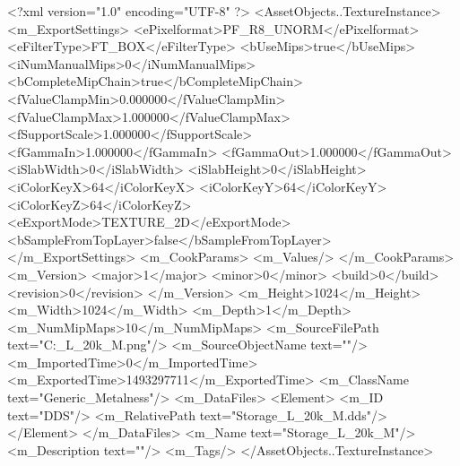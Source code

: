 <?xml version="1.0" encoding="UTF-8" ?>
<AssetObjects..TextureInstance>
	<m_ExportSettings>
		<ePixelformat>PF_R8_UNORM</ePixelformat>
		<eFilterType>FT_BOX</eFilterType>
		<bUseMips>true</bUseMips>
		<iNumManualMips>0</iNumManualMips>
		<bCompleteMipChain>true</bCompleteMipChain>
		<fValueClampMin>0.000000</fValueClampMin>
		<fValueClampMax>1.000000</fValueClampMax>
		<fSupportScale>1.000000</fSupportScale>
		<fGammaIn>1.000000</fGammaIn>
		<fGammaOut>1.000000</fGammaOut>
		<iSlabWidth>0</iSlabWidth>
		<iSlabHeight>0</iSlabHeight>
		<iColorKeyX>64</iColorKeyX>
		<iColorKeyY>64</iColorKeyY>
		<iColorKeyZ>64</iColorKeyZ>
		<eExportMode>TEXTURE_2D</eExportMode>
		<bSampleFromTopLayer>false</bSampleFromTopLayer>
	</m_ExportSettings>
	<m_CookParams>
		<m_Values/>
	</m_CookParams>
	<m_Version>
		<major>1</major>
		<minor>0</minor>
		<build>0</build>
		<revision>0</revision>
	</m_Version>
	<m_Height>1024</m_Height>
	<m_Width>1024</m_Width>
	<m_Depth>1</m_Depth>
	<m_NumMipMaps>10</m_NumMipMaps>
	<m_SourceFilePath text="C:\Users\Shadow\Desktop\Prototypes\Storage_L_20k_M.png"/>
	<m_SourceObjectName text=""/>
	<m_ImportedTime>0</m_ImportedTime>
	<m_ExportedTime>1493297711</m_ExportedTime>
	<m_ClassName text="Generic_Metalness"/>
	<m_DataFiles>
		<Element>
			<m_ID text="DDS"/>
			<m_RelativePath text="Storage_L_20k_M.dds"/>
		</Element>
	</m_DataFiles>
	<m_Name text="Storage_L_20k_M"/>
	<m_Description text=""/>
	<m_Tags/>
</AssetObjects..TextureInstance>

